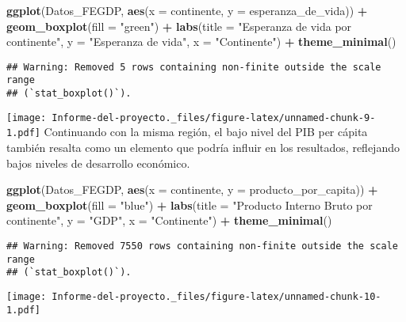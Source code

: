 \documentclass[
]{article}
\newenvironment{Shaded}{\begin{snugshade}}{\end{snugshade}}
\newcommand{\AttributeTok}[1]{\textcolor[rgb]{0.13,0.29,0.53}{#1}}
\newcommand{\FunctionTok}[1]{\textcolor[rgb]{0.13,0.29,0.53}{\textbf{#1}}}
\newcommand{\NormalTok}[1]{#1}
\newcommand{\SpecialCharTok}[1]{\textcolor[rgb]{0.81,0.36,0.00}{\textbf{#1}}}
\newcommand{\StringTok}[1]{\textcolor[rgb]{0.31,0.60,0.02}{#1}}
\begin{document}
\begin{Shaded}
\begin{Highlighting}[]
\FunctionTok{ggplot}\NormalTok{(Datos\_FEGDP, }\FunctionTok{aes}\NormalTok{(}\AttributeTok{x =}\NormalTok{ continente, }\AttributeTok{y =}\NormalTok{ esperanza\_de\_vida)) }\SpecialCharTok{+}
  \FunctionTok{geom\_boxplot}\NormalTok{(}\AttributeTok{fill =} \StringTok{"green"}\NormalTok{) }\SpecialCharTok{+}
  \FunctionTok{labs}\NormalTok{(}\AttributeTok{title =} \StringTok{"Esperanza de vida por continente"}\NormalTok{, }\AttributeTok{y =} \StringTok{"Esperanza de vida"}\NormalTok{, }\AttributeTok{x =} \StringTok{"Continente"}\NormalTok{) }\SpecialCharTok{+}
  \FunctionTok{theme\_minimal}\NormalTok{()}
\end{Highlighting}
\end{Shaded}

\begin{verbatim}
## Warning: Removed 5 rows containing non-finite outside the scale range
## (`stat_boxplot()`).
\end{verbatim}

\texttt{[image: Informe-del-proyecto.\_files/figure-latex/unnamed-chunk-9-1.pdf]}
Continuando con la misma región, el bajo nivel del PIB per cápita
también resalta como un elemento que podría influir en los resultados,
reflejando bajos niveles de desarrollo económico.

\begin{Shaded}
\begin{Highlighting}[]
\FunctionTok{ggplot}\NormalTok{(Datos\_FEGDP, }\FunctionTok{aes}\NormalTok{(}\AttributeTok{x =}\NormalTok{ continente, }\AttributeTok{y =}\NormalTok{ producto\_por\_capita)) }\SpecialCharTok{+}
  \FunctionTok{geom\_boxplot}\NormalTok{(}\AttributeTok{fill =} \StringTok{"blue"}\NormalTok{) }\SpecialCharTok{+}
  \FunctionTok{labs}\NormalTok{(}\AttributeTok{title =} \StringTok{"Producto Interno Bruto por continente"}\NormalTok{, }\AttributeTok{y =} \StringTok{"GDP"}\NormalTok{, }\AttributeTok{x =} \StringTok{"Continente"}\NormalTok{) }\SpecialCharTok{+}
  \FunctionTok{theme\_minimal}\NormalTok{()}
\end{Highlighting}
\end{Shaded}

\begin{verbatim}
## Warning: Removed 7550 rows containing non-finite outside the scale range
## (`stat_boxplot()`).
\end{verbatim}

\texttt{[image: Informe-del-proyecto.\_files/figure-latex/unnamed-chunk-10-1.pdf]}
\end{document}
